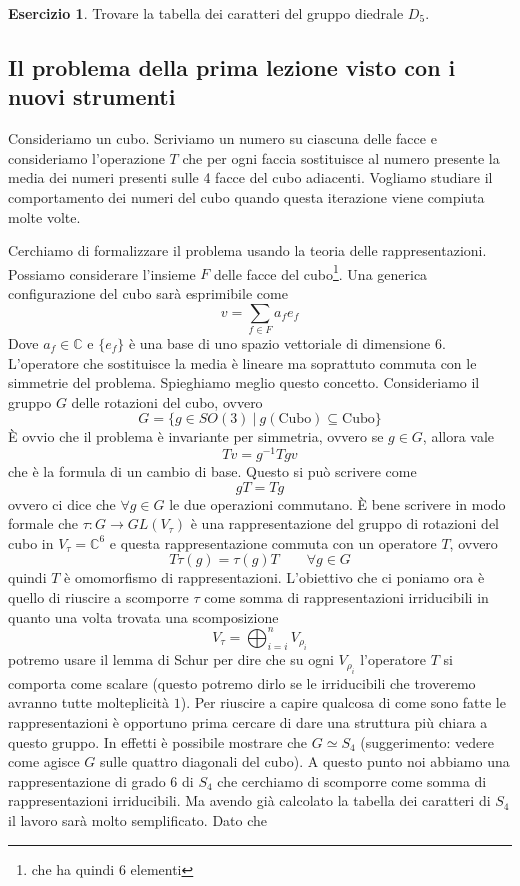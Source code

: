 \documentclass[11pt]{article}
\theoremstyle{plain}
\theoremstyle{definition}
\newtheorem{exercise}{Esercizio}[section]
\theoremstyle{remark}
\newcommand{\dsum}{\displaystyle\sum}
\DeclareMathOperator{\iso}{\simeq}
\begin{document}
\begin{exercise}
Trovare la tabella dei caratteri del gruppo diedrale $D_5$.
\end{exercise}


\subsection{Il problema della prima lezione visto con i nuovi strumenti}
Consideriamo un cubo. Scriviamo un numero su ciascuna delle facce e consideriamo l'operazione $T$ che per ogni faccia sostituisce al numero presente la media dei numeri presenti sulle 4 facce del cubo adiacenti. Vogliamo studiare il comportamento dei numeri del cubo quando questa iterazione viene compiuta molte volte.

Cerchiamo di formalizzare il problema usando la teoria delle rappresentazioni. Possiamo considerare l'insieme $F$ delle facce del cubo\footnote{che ha quindi 6 elementi}. Una generica configurazione del cubo sarà esprimibile come
\[ v = \dsum_{f \in F} a_f e_f \]
Dove $a_f \in \mathbb{C}$ e $\{e_f\}$ è una base di uno spazio vettoriale di dimensione $6$. L'operatore che sostituisce la media è lineare ma soprattuto commuta con le simmetrie del problema. Spieghiamo meglio questo concetto.
Consideriamo il gruppo $G$ delle rotazioni del cubo, ovvero
\[G = \{ g \in SO(3) \ |\ g(\text{Cubo}) \subseteq \text{Cubo} \} \]
\`E ovvio che il problema è invariante per simmetria, ovvero se $g \in G$, allora vale
\[ T v = g^{-1}T g v \]
che è la formula di un cambio di base. Questo si può scrivere come
\[gT = Tg \]
ovvero ci dice che $\forall g \in G$ le due operazioni commutano. \`E bene scrivere in modo formale che $\tau: G \to GL(V_\tau)$ è una rappresentazione del gruppo di rotazioni del cubo in $V_\tau = \mathbb{C}^6$ e questa rappresentazione commuta con un operatore $T$, ovvero
\[T\tau(g) = \tau(g) T \qquad \forall g \in G  \]
quindi $T$ è omomorfismo di rappresentazioni.
L'obiettivo che ci poniamo ora è quello di riuscire a scomporre $\tau$ come somma di rappresentazioni irriducibili in quanto una volta trovata una scomposizione
\[ V_\tau = \bigoplus_{i = i}^n V_{\rho_i} \]
potremo usare il lemma di Schur per dire che su ogni $V_{\rho_i}$ l'operatore $T$ si comporta come scalare (questo potremo dirlo se le irriducibili che troveremo avranno tutte molteplicità $1$). Per riuscire a capire qualcosa di come sono fatte le rappresentazioni è opportuno prima cercare di dare una struttura più chiara a questo gruppo.
In effetti è possibile mostrare che $G \iso S_4$ (suggerimento: vedere come agisce $G$ sulle quattro diagonali del cubo). A questo punto noi abbiamo una rappresentazione di grado 6 di $S_4$ che cerchiamo di scomporre come somma di rappresentazioni irriducibili. Ma avendo già calcolato la tabella dei caratteri di $S_4$ il lavoro sarà molto semplificato. Dato che
\end{document}

